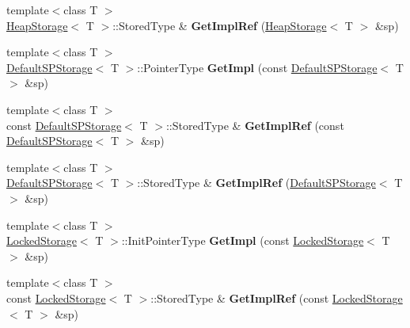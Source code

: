 \begin{DoxyCompactItemize}
\item 
\hypertarget{namespaceLoki_a1e0e695b9bc89c64bd244bf97c7d7c99}{}{\footnotesize template$<$class T $>$ }\\\hyperlink{classLoki_1_1HeapStorage}{Heap\+Storage}$<$ T $>$\+::Stored\+Type \& {\bfseries Get\+Impl\+Ref} (\hyperlink{classLoki_1_1HeapStorage}{Heap\+Storage}$<$ T $>$ \&sp)\label{namespaceLoki_a1e0e695b9bc89c64bd244bf97c7d7c99}

\item 
\hypertarget{namespaceLoki_a044ba6f21cb5d95ab276756ed6e443e4}{}{\footnotesize template$<$class T $>$ }\\\hyperlink{classLoki_1_1DefaultSPStorage}{Default\+S\+P\+Storage}$<$ T $>$\+::Pointer\+Type {\bfseries Get\+Impl} (const \hyperlink{classLoki_1_1DefaultSPStorage}{Default\+S\+P\+Storage}$<$ T $>$ \&sp)\label{namespaceLoki_a044ba6f21cb5d95ab276756ed6e443e4}

\item 
\hypertarget{namespaceLoki_a715705ab9e0f7d25875f6a1f815ec3cc}{}{\footnotesize template$<$class T $>$ }\\const \hyperlink{classLoki_1_1DefaultSPStorage}{Default\+S\+P\+Storage}$<$ T $>$\+::Stored\+Type \& {\bfseries Get\+Impl\+Ref} (const \hyperlink{classLoki_1_1DefaultSPStorage}{Default\+S\+P\+Storage}$<$ T $>$ \&sp)\label{namespaceLoki_a715705ab9e0f7d25875f6a1f815ec3cc}

\item 
\hypertarget{namespaceLoki_a9c9596b6ae2b71553e6a4d7db2f3d100}{}{\footnotesize template$<$class T $>$ }\\\hyperlink{classLoki_1_1DefaultSPStorage}{Default\+S\+P\+Storage}$<$ T $>$\+::Stored\+Type \& {\bfseries Get\+Impl\+Ref} (\hyperlink{classLoki_1_1DefaultSPStorage}{Default\+S\+P\+Storage}$<$ T $>$ \&sp)\label{namespaceLoki_a9c9596b6ae2b71553e6a4d7db2f3d100}

\item 
\hypertarget{namespaceLoki_a9332a5c639ef6d151eed8add17d44626}{}{\footnotesize template$<$class T $>$ }\\\hyperlink{classLoki_1_1LockedStorage}{Locked\+Storage}$<$ T $>$\+::Init\+Pointer\+Type {\bfseries Get\+Impl} (const \hyperlink{classLoki_1_1LockedStorage}{Locked\+Storage}$<$ T $>$ \&sp)\label{namespaceLoki_a9332a5c639ef6d151eed8add17d44626}

\item 
\hypertarget{namespaceLoki_a7a51e946a1cd264f3e09da2231bb45e9}{}{\footnotesize template$<$class T $>$ }\\const \hyperlink{classLoki_1_1LockedStorage}{Locked\+Storage}$<$ T $>$\+::Stored\+Type \& {\bfseries Get\+Impl\+Ref} (const \hyperlink{classLoki_1_1LockedStorage}{Locked\+Storage}$<$ T $>$ \&sp)\label{namespaceLoki_a7a51e946a1cd264f3e09da2231bb45e9}


\end{DoxyCompactItemize}
